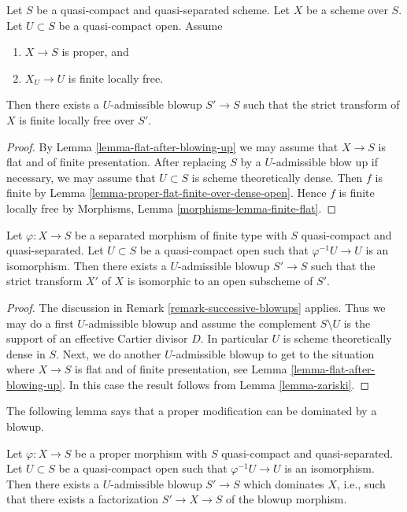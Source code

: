 \begin{lemma}
\label{lemma-finite-after-blowing-up}
Let $S$ be a quasi-compact and quasi-separated scheme.
Let $X$ be a scheme over $S$.
Let $U \subset S$ be a quasi-compact open.
Assume
\begin{enumerate}
\item $X \to S$ is proper, and
\item $X_U \to U$ is finite locally free.
\end{enumerate}
Then there exists a $U$-admissible blowup $S' \to S$ such that
the strict transform of $X$ is finite locally free over $S'$.
\end{lemma}

\begin{proof}
By Lemma \ref{lemma-flat-after-blowing-up} we may assume that
$X \to S$ is flat and of finite presentation. After replacing
$S$ by a $U$-admissible blow up if necessary, we may assume
that $U \subset S$ is scheme theoretically dense. Then $f$ is
finite by Lemma \ref{lemma-proper-flat-finite-over-dense-open}.
Hence $f$ is finite locally free by
Morphisms, Lemma \ref{morphisms-lemma-finite-flat}.
\end{proof}

\begin{lemma}
\label{lemma-zariski-after-blowup}
Let $\varphi : X \to S$ be a separated morphism of finite type with
$S$ quasi-compact and quasi-separated. Let $U \subset S$ be a
quasi-compact open such that $\varphi^{-1}U \to U$ is an isomorphism.
Then there exists a $U$-admissible blowup $S' \to S$ such that
the strict transform $X'$ of $X$ is isomorphic to an open subscheme
of $S'$.
\end{lemma}

\begin{proof}
The discussion in Remark \ref{remark-successive-blowups} applies.
Thus we may do a first $U$-admissible blowup and assume the complement
$S \setminus U$ is the support of an effective Cartier divisor $D$.
In particular $U$ is scheme theoretically dense in $S$.
Next, we do another $U$-admissible blowup to get to the situation where
$X \to S$ is flat and of finite presentation, see
Lemma \ref{lemma-flat-after-blowing-up}.
In this case the result follows from Lemma \ref{lemma-zariski}.
\end{proof}

\noindent
The following lemma says that a proper modification can be dominated
by a blowup.

\begin{lemma}
\label{lemma-dominate-modification-by-blowup}
Let $\varphi : X \to S$ be a proper morphism with
$S$ quasi-compact and quasi-separated. Let $U \subset S$ be a
quasi-compact open such that $\varphi^{-1}U \to U$ is an isomorphism.
Then there exists a $U$-admissible blowup $S' \to S$
which dominates $X$, i.e., such that there exists a factorization
$S' \to X \to S$ of the blowup morphism.
\end{lemma}

